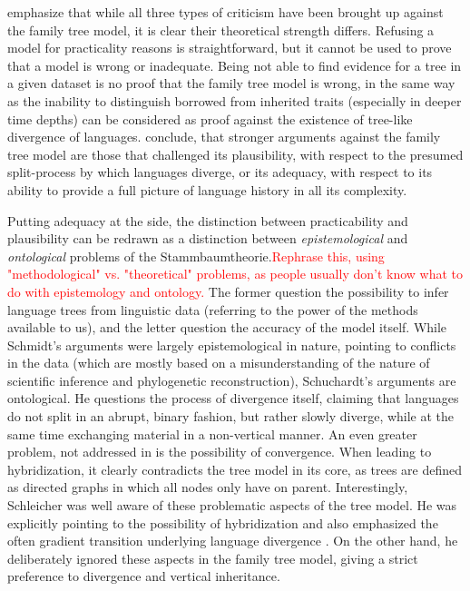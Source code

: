 \documentclass[svgnames,12pt]{scrartcl}
\newcommand\Comment[1]{\textcolor{red}{#1}}
\begin{document}
{\citet{Geisler2013} emphasize that while all three types of criticism have been brought up against the family tree model, it is clear
their theoretical strength differs. Refusing a model for practicality reasons is
straightforward, but it cannot be used to prove that a model is wrong or inadequate.
Being not
able to find evidence for a tree in a given dataset is no proof that the family tree model is wrong,
in the same way as the inability to distinguish borrowed from inherited traits (especially in deeper
time depths) can be considered as proof against the existence of tree-like divergence of languages.
\citet{Geisler2013} conclude, that stronger arguments against the family tree model are those that challenged its
plausibility, with respect to the presumed split-process by which languages diverge, or its
adequacy, with respect to its ability to provide a full picture of language history in all its
complexity.
 
Putting adequacy at the side, the distinction between practicability and plausibility can be redrawn
as a distinction between \emph{epistemological} and \emph{ontological} problems of the
Stammbaumtheorie.\Comment{Rephrase this, using "methodological" vs. "theoretical" problems, as
people usually don't know what to do with epistemology and ontology.} The former question the possibility to infer language trees from linguistic data
(referring to the power of the methods available to us),
and the letter question the accuracy of the model itself. While Schmidt's arguments were largely
epistemological in nature, pointing to conflicts in the data (which are mostly based on a
misunderstanding of the nature of scientific inference and phylogenetic reconstruction),
Schuchardt's arguments are ontological. He questions the process of divergence itself, claiming that
languages do not split in an abrupt, binary fashion, but rather slowly diverge, while at the same
time exchanging material in a non-vertical manner. An even greater problem, not addressed in
\citet{Schuchardt1870} is the possibility of convergence. When leading to hybridization, it clearly
contradicts the tree model in its core, as trees are defined as directed graphs in which all nodes
only have on parent.
Interestingly, Schleicher was well aware of these problematic aspects of the tree
model. He was explicitly pointing to the possibility of hybridization 
\citep{Schleicher1848} and also emphasized the often gradient
transition underlying language divergence \citep[21]{Schleicher1863}.
On the other hand, he deliberately ignored these aspects in the family
tree model, giving a strict preference to divergence and vertical inheritance. 
 
}
\end{document}
